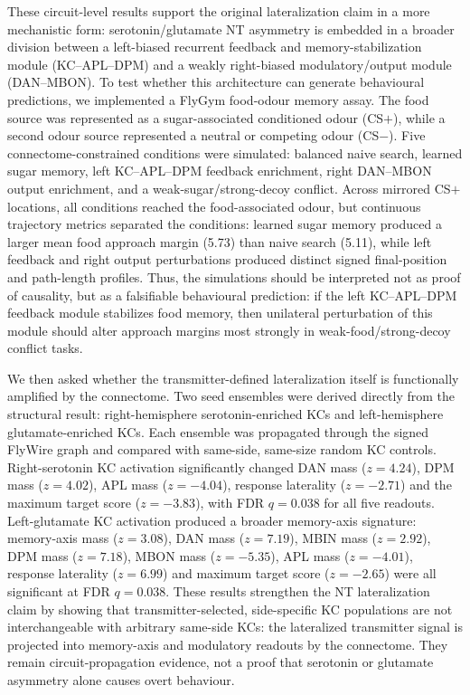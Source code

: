 \documentclass[10pt]{article}
\begin{document}
These circuit-level results support the original lateralization claim in a more mechanistic form: serotonin/glutamate NT asymmetry is embedded in a broader division between a left-biased recurrent feedback and memory-stabilization module (KC--APL--DPM) and a weakly right-biased modulatory/output module (DAN--MBON). To test whether this architecture can generate behavioural predictions, we implemented a FlyGym food-odour memory assay. The food source was represented as a sugar-associated conditioned odour (CS$+$), while a second odour source represented a neutral or competing odour (CS$-$). Five connectome-constrained conditions were simulated: balanced naive search, learned sugar memory, left KC--APL--DPM feedback enrichment, right DAN--MBON output enrichment, and a weak-sugar/strong-decoy conflict. Across mirrored CS$+$ locations, all conditions reached the food-associated odour, but continuous trajectory metrics separated the conditions: learned sugar memory produced a larger mean food approach margin (5.73) than naive search (5.11), while left feedback and right output perturbations produced distinct signed final-position and path-length profiles. Thus, the simulations should be interpreted not as proof of causality, but as a falsifiable behavioural prediction: if the left KC--APL--DPM feedback module stabilizes food memory, then unilateral perturbation of this module should alter approach margins most strongly in weak-food/strong-decoy conflict tasks.

We then asked whether the transmitter-defined lateralization itself is functionally amplified by the connectome. Two seed ensembles were derived directly from the structural result: right-hemisphere serotonin-enriched KCs and left-hemisphere glutamate-enriched KCs. Each ensemble was propagated through the signed FlyWire graph and compared with same-side, same-size random KC controls. Right-serotonin KC activation significantly changed DAN mass ($z=4.24$), DPM mass ($z=4.02$), APL mass ($z=-4.04$), response laterality ($z=-2.71$) and the maximum target score ($z=-3.83$), with FDR $q=0.038$ for all five readouts. Left-glutamate KC activation produced a broader memory-axis signature: memory-axis mass ($z=3.08$), DAN mass ($z=7.19$), MBIN mass ($z=2.92$), DPM mass ($z=7.18$), MBON mass ($z=-5.35$), APL mass ($z=-4.01$), response laterality ($z=6.99$) and maximum target score ($z=-2.65$) were all significant at FDR $q=0.038$. These results strengthen the NT lateralization claim by showing that transmitter-selected, side-specific KC populations are not interchangeable with arbitrary same-side KCs: the lateralized transmitter signal is projected into memory-axis and modulatory readouts by the connectome. They remain circuit-propagation evidence, not a proof that serotonin or glutamate asymmetry alone causes overt behaviour.
\end{document}
